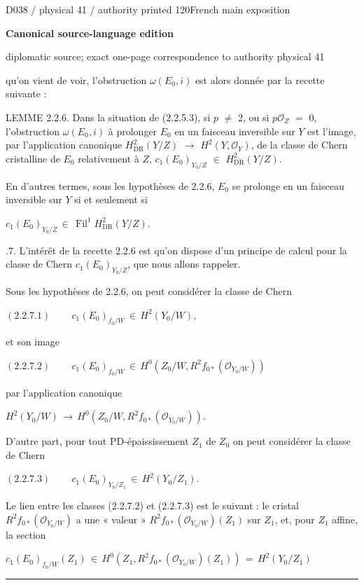 \documentclass[9pt]{article}
\newcommand{\CanonText}[1]{\par{\fontsize{8.0}{9.35}\selectfont\RaggedRight #1\par}\vspace{2.2pt}}
\newcommand{\CanonDisplay}[1]{\par\vspace{1.2pt}\begin{center}{\fontsize{7.2}{8.4}\selectfont\(\displaystyle #1\)}\end{center}\vspace{1.2pt}}
\newcommand{\LayerTitle}{Canonical source-language edition}
\begin{document}
\noindent\begin{minipage}[t][\dimexpr\textheight-5pt\relax][t]{\textwidth}
{\sffamily\fontsize{7.3}{8.2}\selectfont\color{Quiet} D038 / physical 41 / authority printed 120\hfill French main exposition}
\par{}\vspace{4.5pt}
{\sffamily\fontsize{10.4}{11.6}\selectfont\bfseries\color{Accent} \LayerTitle}
\par{\sffamily\fontsize{6.7}{7.7}\selectfont\color{Quiet} diplomatic source; exact one-page correspondence to authority physical 41}
\vspace{5pt}
\CanonText{qu'on vient de voir, l'obstruction \(\omega{}(E_{0},i)\) est alors donnée par la recette suivante :}
\CanonText{LEMME 2.2.6. Dans la situation de (2.2.5.3), si \(p\) \(\neq{}\) 2, ou si \(p\mathcal{O}_{Z}\) \(=\) 0, l'obstruction \(\omega{}(E_{0},i)\) à prolonger \(E_{0}\) en un faisceau inversible sur \(Y\) est l'image, par l'application canonique \(H^{2}_{\mathrm{DR}}(Y/Z)\) \(\to{}\) \(H^{2}(Y,\mathcal{O}_{Y})\), de la classe de Chern cristalline de \(E_{0}\) relativement à \(Z\), \(c_{1}(E_{0})_{Y_{0}/Z}\) \(\in{}\) \(H^{2}_{\mathrm{DR}}(Y/Z)\).}
\CanonText{En d'autres termes, sous les hypothèses de 2.2.6, \(E_{0}\) se prolonge en un faisceau inversible sur \(Y\) si et seulement si}
\CanonDisplay{c_{1}(E_{0})_{Y_{0}/Z}\,\in{}\,\operatorname{Fil}^{1}H^{2}_{\mathrm{DR}}(Y/Z).}
\CanonText{2.2.7. L'intérêt de la recette 2.2.6 est qu'on dispose d'un principe de calcul pour la classe de Chern \(c_{1}(E_{0})_{Y_{0}/Z}\), que nous allons rappeler.}
\CanonText{Sous les hypothèses de 2.2.6, on peut considérer la classe de Chern}
\CanonDisplay{(2.2.7.1)\qquad\,c_{1}(E_{0})_{f_{0}/W}\,\in{}\,H^{2}(Y_{0}/W),}
\CanonText{et son image}
\CanonDisplay{(2.2.7.2)\qquad\,c_{1}(E_{0})_{f_{0}/W}\,\in{}\,H^{0}(Z_{0}/W,R^{2}f_{0*}(\mathcal{O}_{Y_{0}/W}))}
\CanonText{par l'application canonique}
\CanonDisplay{H^{2}(Y_{0}/W)\,\to{}\,H^{0}(Z_{0}/W,R^{2}f_{0*}(\mathcal{O}_{Y_{0}/W})).}
\CanonText{D'autre part, pour tout PD-épaississement \(Z_{1}\) de \(Z_{0}\) on peut considérer la classe de Chern}
\CanonDisplay{(2.2.7.3)\qquad\,c_{1}(E_{0})_{Y_{0}/Z_{1}}\,\in{}\,H^{2}(Y_{0}/Z_{1}).}
\CanonText{Le lien entre les classes (2.2.7.2) et (2.2.7.3) est le suivant : le cristal \(R^{2}f_{0*}(\mathcal{O}_{Y_{0}/W})\) a une « valeur » \(R^{2}f_{0*}(\mathcal{O}_{Y_{0}/W})(Z_{1})\) sur \(Z_{1}\), et, pour \(Z_{1}\) affine, la section}
\CanonDisplay{c_{1}(E_{0})_{f_{0}/W}(Z_{1})\,\in{}\,H^{0}(Z_{1},R^{2}f_{0*}(\mathcal{O}_{Y_{0}/W})(Z_{1}))\,=\,H^{2}(Y_{0}/Z_{1})}
\vfill
{\color{Accent}\hrule height 0.35pt}\vspace{3pt}
\end{minipage}
\end{document}
